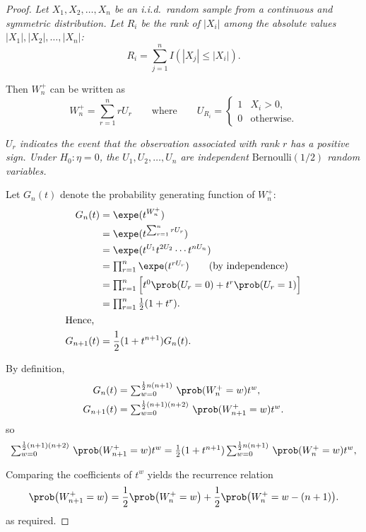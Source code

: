 \begin{proof}
\bit
\it Let $X_1,X_2,\ldots,X_n$ be an i.i.d.\ random sample from a continuous and symmetric distribution.
\it Let $R_i$ be the rank of $|X_i|$ among the absolute values $|X_1|,|X_2|,\ldots,|X_n|$:
\[
R_i = \sum_{j=1}^n I(|X_j| \leq |X_i|).
\]
\eit

Then $W^{+}_n$ can be written as
\[
W^{+}_n = \sum_{r=1}^n rU_r \qquad\text{where}\qquad U_{R_i} = \begin{cases} 1 & X_i > 0, \\ 0 & \text{otherwise.}\end{cases}
\]

\bit
\it $U_r$ indicates the event that the observation associated with rank $r$ has a positive sign.
\it Under $H_0\!:\!\eta=0$, the $U_1,U_2,\ldots,U_n$ are independent $\text{Bernoulli}(1/2)$ random variables.
\eit

Let $G_n(t)$ denote the probability generating function of $W^{+}_n$:
\begin{align*}
G_n(t) 
	& = \expe(t^{W^{+}_n})  \\
	& = \expe(t^{\sum_{r=1}^n rU_r}) \\
	& = \expe(t^{U_1}t^{2U_2}\cdots t^{nU_n}) \\
	& = \textstyle\prod_{r=1}^n \expe(t^{rU_r}) \qquad\text{(by independence)} \\
	& = \textstyle\prod_{r=1}^n \Big[t^0\prob(U_r=0) + t^r\prob(U_r=1)\Big] \\
	& = \textstyle\prod_{r=1}^n \frac{1}{2}(1 + t^r). \\
\intertext{Hence,}
G_{n+1}(t) 
	& = \frac{1}{2}(1 + t^{n+1})G_n(t).
\end{align*}

By definition,
\begin{align*}
G_n(t)		& = \textstyle\sum_{w=0}^{\frac{1}{2}n(n+1)}\,\prob(W^{+}_n=w)t^w, \\
G_{n+1}(t)	& = \textstyle\sum_{w=0}^{\frac{1}{2}(n+1)(n+2)}\,\prob(W^{+}_{n+1}=w)t^w.
\end{align*}
so
\[
\textstyle\sum_{w=0}^{\frac{1}{2}(n+1)(n+2)}\,\prob(W^{+}_{n+1}=w)t^w 
	= \frac{1}{2}(1+t^{n+1})\sum_{w=0}^{\frac{1}{2}n(n+1)}\,\prob(W^{+}_n=w)t^w,
\]

Comparing the coefficients of $t^w$ yields the recurrence relation
\[
\prob\big(W^{+}_{n+1}=w\big) = \frac{1}{2}\prob\big(W^{+}_n=w\big) + \frac{1}{2}\prob\big(W^{+}_n=w-(n+1)\big).
\]
as required.
\end{proof}

